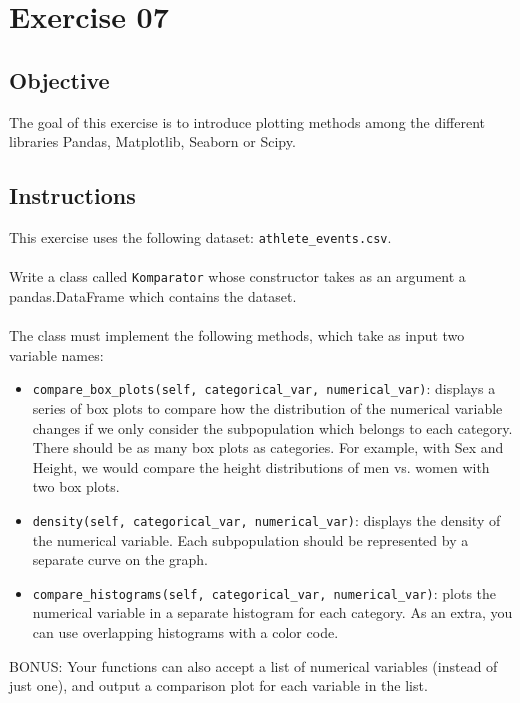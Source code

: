 \chapter{Exercise 07}
\makeheaderfilesforbidden


\section*{Objective}
The goal of this exercise is to introduce plotting methods among the different
libraries Pandas, Matplotlib, Seaborn or Scipy.

\section*{Instructions}
This exercise uses the following dataset: \texttt{athlete\_events.csv}.\\
\\
Write a class called \texttt{Komparator} whose constructor takes as an argument a pandas.DataFrame which contains the dataset.\\
\\
The class must implement the following methods, which take as input two variable names:
\begin{itemize}
  \item \texttt{compare\_box\_plots(self, categorical\_var, numerical\_var)}: displays a series of box plots 
  to compare how the distribution of the numerical variable changes if we only consider 
  the subpopulation which belongs to each category. 
  There should be as many box plots as categories. 
  For example, with Sex and Height, we would compare 
  the height distributions of men vs. women with two box plots.
  \item \texttt{density(self, categorical\_var, numerical\_var)}: displays the density of the numerical variable.
  Each subpopulation should be represented by a separate curve on the graph.
  \item \texttt{compare\_histograms(self, categorical\_var, numerical\_var)}: plots the numerical variable in a separate histogram for each category.
  As an extra, you can use overlapping histograms with a color code.
\end{itemize}
BONUS: Your functions can also accept a list of numerical variables (instead of just one), and output a comparison plot for each variable in the list.
